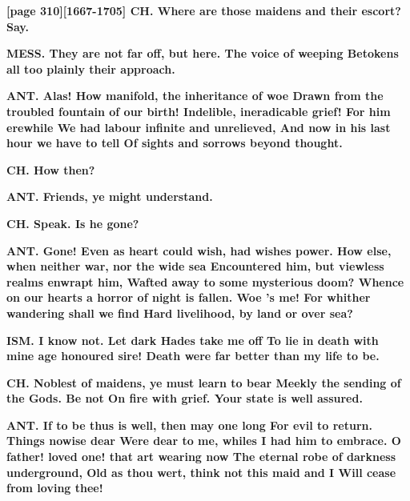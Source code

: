 \documentclass[11pt,letter]{book}
\begin{document}
\par \textbf{[page 310][1667-1705] CH. Where are those maidens and their escort? Say.}
\par 

\par \textbf{MESS. They are not far off, but here. The voice of weeping Betokens all too plainly their approach.}
\par 

\par \textbf{ANT. Alas! How manifold, the inheritance of woe Drawn from the troubled fountain of our birth! Indelible, ineradicable grief! For him erewhile We had labour infinite and unrelieved, And now in his last hour we have to tell Of sights and sorrows beyond thought.}
\par 

\par \textbf{CH. How then?}
\par 

\par \textbf{ANT. Friends, ye might understand.}
\par 

\par \textbf{CH. Speak. Is he gone?}
\par 

\par \textbf{ANT. Gone! Even as heart could wish, had wishes power. How else, when neither war, nor the wide sea Encountered him, but viewless realms enwrapt him, Wafted away to some mysterious doom? Whence on our hearts a horror of night is fallen. Woe ’s me! For whither wandering shall we find Hard livelihood, by land or over sea?}
\par 

\par \textbf{ISM. I know not. Let dark Hades take me off To lie in death with mine age honoured sire! Death were far better than my life to be.}
\par 

\par \textbf{CH. Noblest of maidens, ye must learn to bear Meekly the sending of the Gods. Be not On fire with grief. Your state is well assured.}
\par 

\par \textbf{ANT. If to be thus is well, then may one long For evil to return. Things nowise dear Were dear to me, whiles I had him to embrace. O father! loved one! that art wearing now The eternal robe of darkness underground, Old as thou wert, think not this maid and I Will cease from loving thee!}
\par 
\end{document}
